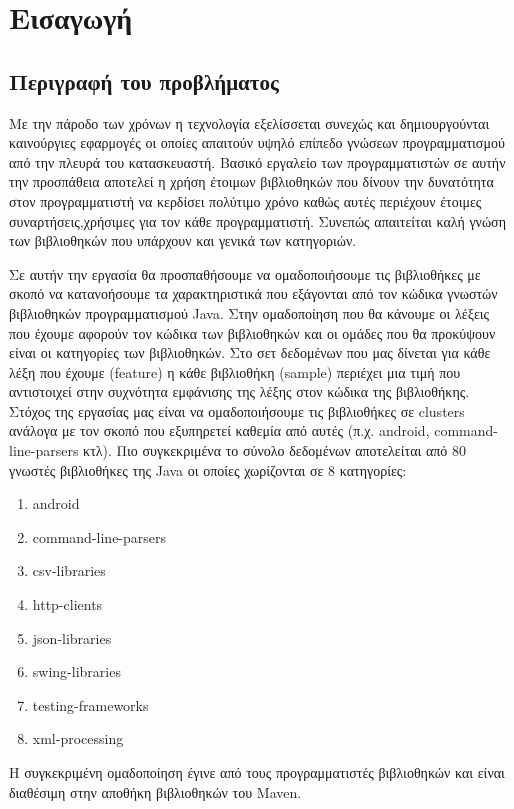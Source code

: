 \chapter{Εισαγωγή}
\section{Περιγραφή του προβλήματος}
Με την πάροδο των χρόνων η τεχνολογία εξελίσσεται συνεχώς και δημιουργούνται καινούργιες εφαρμογές οι οποίες απαιτούν υψηλό επίπεδο γνώσεων προγραμματισμού από την πλευρά του κατασκευαστή. Βασικό εργαλείο των προγραμματιστών σε αυτήν την προσπάθεια αποτελεί η χρήση έτοιμων βιβλιοθηκών που δίνουν την δυνατότητα στον προγραμματιστή να κερδίσει πολύτιμο χρόνο καθώς αυτές περιέχουν έτοιμες συναρτήσεις,χρήσιμες για τον κάθε προγραμματιστή. Συνεπώς απαιτείται καλή γνώση των βιβλιοθηκών που υπάρχουν και γενικά των κατηγοριών.

Σε αυτήν την εργασία θα προσπαθήσουμε να ομαδοποιήσουμε τις βιβλιοθήκες με σκοπό να κατανοήσουμε τα χαρακτηριστικά που εξάγονται από τον κώδικα γνωστών βιβλιοθηκών προγραμματισμού Java. Στην ομαδοποίηση που θα κάνουμε οι λέξεις που έχουμε αφορούν τον κώδικα των βιβλιοθηκών και οι ομάδες που θα προκύψουν είναι οι κατηγορίες των βιβλιοθηκών. Στο σετ δεδομένων που μας δίνεται για κάθε λέξη που έχουμε (feature) η κάθε βιβλιοθήκη (sample) περιέχει μια τιμή που αντιστοιχεί στην συχνότητα εμφάνισης της λέξης στον κώδικα της βιβλιοθήκης. Στόχος της εργασίας μας είναι να ομαδοποιήσουμε τις βιβλιοθήκες σε clusters ανάλογα με τον σκοπό που εξυπηρετεί καθεμία από αυτές (π.χ. android, command-line-parsers κτλ). Πιο συγκεκριμένα το σύνολο δεδομένων αποτελείται από 80 γνωστές βιβλιοθήκες της Java οι οποίες χωρίζονται σε 8 κατηγορίες:

\begin{enumerate}
	\item  android
	\item  command-line-parsers
	\item  csv-libraries
	\item  http-clients
	\item  json-libraries
	\item  swing-libraries
	\item  testing-frameworks
	\item  xml-processing
\end{enumerate} 

Η συγκεκριμένη ομαδοποίηση έγινε από τους προγραμματιστές βιβλιοθηκών και είναι διαθέσιμη στην αποθήκη βιβλιοθηκών του Maven.

